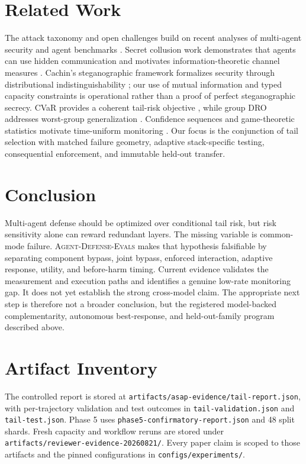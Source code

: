 \documentclass[10pt]{article}
\newcommand{\system}{\textsc{Agent-Defense-Evals}}
\begin{document}
\section{Related Work}
The attack taxonomy and open challenges build on recent analyses of multi-agent security and agent benchmarks \citep{openchallenges,agentsecuritybench}. Secret collusion work demonstrates that agents can use hidden communication and motivates information-theoretic channel measures \citep{secretcollusion}. Cachin's steganographic framework formalizes security through distributional indistinguishability \citep{cachin1998}; our use of mutual information and typed capacity constraints is operational rather than a proof of perfect steganographic secrecy. CVaR provides a coherent tail-risk objective \citep{rockafellar2000}, while group DRO addresses worst-group generalization \citep{sagawa2019}. Confidence sequences and game-theoretic statistics motivate time-uniform monitoring \citep{howard2021,ramdas2023}. Our focus is the conjunction of tail selection with matched failure geometry, adaptive stack-specific testing, consequential enforcement, and immutable held-out transfer.

\section{Conclusion}
Multi-agent defense should be optimized over conditional tail risk, but risk sensitivity alone can reward redundant layers. The missing variable is common-mode failure. \system{} makes that hypothesis falsifiable by separating component bypass, joint bypass, enforced interaction, adaptive response, utility, and before-harm timing. Current evidence validates the measurement and execution paths and identifies a genuine low-rate monitoring gap. It does not yet establish the strong cross-model claim. The appropriate next step is therefore not a broader conclusion, but the registered model-backed complementarity, autonomous best-response, and held-out-family program described above.




\appendix
\section{Artifact Inventory}
The controlled report is stored at \texttt{artifacts/asap-evidence/tail-report.json}, with per-trajectory validation and test outcomes in \texttt{tail-validation.json} and \texttt{tail-test.json}. Phase 5 uses \texttt{phase5-confirmatory-report.json} and 48 split shards. Fresh capacity and workflow reruns are stored under \texttt{artifacts/reviewer-evidence-20260821/}. Every paper claim is scoped to those artifacts and the pinned configurations in \texttt{configs/experiments/}.
\end{document}
